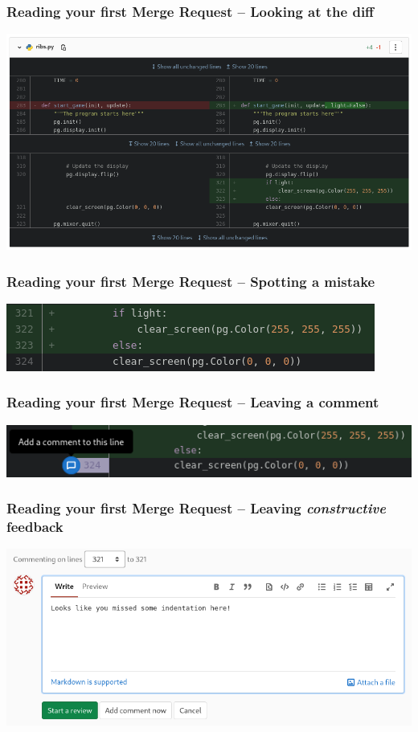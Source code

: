 \documentclass{beamer}
\begin{document}
\begin{frame}[fragile]
  \frametitle{Reading your first Merge Request -- Looking at the diff}
  \includegraphics[width=\linewidth]{gitlab-first-review/04-thediff.png}
\end{frame}

\begin{frame}[fragile]
  \frametitle{Reading your first Merge Request -- Spotting a mistake}
  \includegraphics[width=\linewidth]{gitlab-first-review/05-oopsie.png}
\end{frame}

\begin{frame}[fragile]
  \frametitle{Reading your first Merge Request -- Leaving a comment}
  \includegraphics[width=\linewidth]{gitlab-first-review/06-comment.png}
\end{frame}

\begin{frame}[fragile]
  \frametitle{Reading your first Merge Request -- Leaving \emph{constructive} feedback}
  \includegraphics[width=\linewidth]{gitlab-first-review/07-suggestion.png}
\end{frame}
\end{document}
